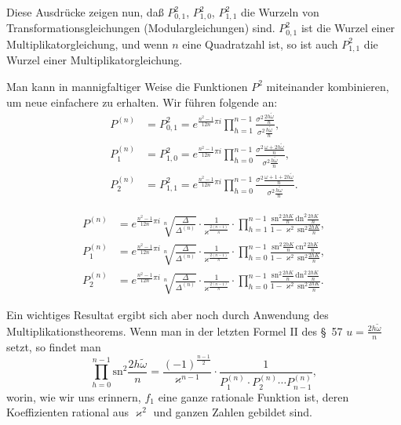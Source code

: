 \documentclass[12pt,a4paper]{article}
\theoremstyle{definition}
\begin{document}
Diese Ausdrücke zeigen nun, daß $P_{0,1}^2$, $P_{1,0}^2$, $P_{1,1}^2$ die Wurzeln von Transformationsgleichungen (Modulargleichungen) sind. $P_{0,1}^2$ ist die Wurzel einer Multiplikatorgleichung, und wenn $n$ eine Quadratzahl ist, so ist auch $P_{1,1}^2$ die Wurzel einer Multiplikatorgleichung.

Man kann in mannigfaltiger Weise die Funktionen $P^2$ miteinander kombinieren, um neue einfachere zu erhalten. Wir führen folgende an:
\begin{equation}\label{eq:67-7}
\begin{aligned}
P^{(n)} &= P_{0,1}^2 = e^{\frac{n^2-1}{12n}\pi i} \prod_{h=1}^{n-1} \frac{\sigma^2\frac{2h\tilde{\omega}}{n}}{\sigma^2\frac{h\tilde{\omega}}{n}}, \\
P^{(n)}_1 &= P_{1,0}^2 = e^{\frac{n^2-1}{12n}\pi i} \prod_{h=0}^{n-1} \frac{\sigma^2\frac{\omega+2h\tilde{\omega}}{n}}{\sigma^2\frac{h\tilde{\omega}}{n}}, \\
P^{(n)}_2 &= P_{1,1}^2 = e^{\frac{n^2-1}{12n}\pi i} \prod_{h=0}^{n-1} \frac{\sigma^2\frac{\omega+1+2h\tilde{\omega}}{n}}{\sigma^2\frac{h\tilde{\omega}}{n}}.
\end{aligned}
\end{equation}


\begin{equation}\label{eq:67-8}
\begin{aligned}
P^{(n)} &= e^{\frac{n^2-1}{12n}\pi i} \sqrt[n]{\frac{\Delta}{\Delta^{(n)}}} \cdot \frac{1}{\varkappa^{\frac{2(n-1)}{n}}} \cdot \prod_{h=1}^{n-1} \frac{\mathrm{sn}^2\frac{2hK}{n}\,\mathrm{dn}^2\frac{2hK}{n}}{1-\varkappa^2\,\mathrm{sn}^2\frac{2hK}{n}}, \\
P^{(n)}_1 &= e^{\frac{n^2-1}{12n}\pi i} \sqrt[n]{\frac{\Delta}{\Delta^{(n)}}} \cdot \frac{1}{\varkappa^{\frac{2(n-1)}{n}}} \cdot \prod_{h=0}^{n-1} \frac{\mathrm{sn}^2\frac{2hK}{n}\,\mathrm{cn}^2\frac{2hK}{n}}{1-\varkappa^2\,\mathrm{sn}^2\frac{2hK}{n}}, \\
P^{(n)}_2 &= e^{\frac{n^2-1}{12n}\pi i} \sqrt[n]{\frac{\Delta}{\Delta^{(n)}}} \cdot \frac{1}{\varkappa^{\frac{2(n-1)}{n}}} \cdot \prod_{h=0}^{n-1} \frac{\mathrm{sn}^2\frac{2hK}{n}\,\mathrm{dn}^2\frac{2hK}{n}}{1-\varkappa^2\,\mathrm{sn}^2\frac{2hK}{n}}.
\end{aligned}
\end{equation}

Ein wichtiges Resultat ergibt sich aber noch durch Anwendung des Multiplikationstheorems. Wenn man in der letzten Formel II des \S\ 57 $u = \frac{2h\tilde{\omega}}{n}$ setzt, so findet man
\begin{equation}\label{eq:67-9}
\prod_{h=0}^{n-1} \mathrm{sn}^2\frac{2h\tilde{\omega}}{n} = \frac{(-1)^{\frac{n-1}{2}}}{\varkappa^{n-1}} \cdot \frac{1}{P^{(n)}_1 \cdot P^{(n)}_2 \cdots P^{(n)}_{n-1}},
\end{equation}
worin, wie wir uns erinnern, $f_1$ eine ganze rationale Funktion ist, deren Koeffizienten rational aus $\varkappa^2$ und ganzen Zahlen gebildet sind.
\end{document}
